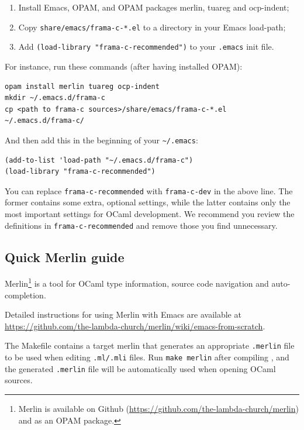 \begin{enumerate}
\item Install Emacs, OPAM, and OPAM packages \textsf{merlin}, \textsf{tuareg}
  and \textsf{ocp-indent};
\item Copy \texttt{share/emacs/frama-c-*.el} to a directory in your Emacs load-path;
\item Add \texttt{(load-library "frama-c-recommended")} to your \texttt{.emacs}
  init file.
\end{enumerate}

For instance, run these commands (after having installed OPAM):

\begin{verbatim}
opam install merlin tuareg ocp-indent
mkdir ~/.emacs.d/frama-c
cp <path to frama-c sources>/share/emacs/frama-c-*.el ~/.emacs.d/frama-c/
\end{verbatim}

And then add this in the beginning of your \texttt{\textasciitilde/.emacs}:

\begin{verbatim}
(add-to-list 'load-path "~/.emacs.d/frama-c")
(load-library "frama-c-recommended")
\end{verbatim}

You can replace \texttt{frama-c-recommended} with \texttt{frama-c-dev} in the
above line. The former contains some extra, optional settings, while the latter
contains only the most important settings for OCaml development. We recommend
you review the definitions in \texttt{frama-c-recommended} and remove those you
find unnecessary.

\subsection{Quick Merlin guide}

Merlin\footnote{Merlin is available on Github
  (\url{https://github.com/the-lambda-church/merlin}) and as an OPAM package.}
is a tool for OCaml type information, source code navigation and
auto-completion.

Detailed instructions for using Merlin with Emacs are available at
\url{https://github.com/the-lambda-church/merlin/wiki/emacs-from-scratch}.

The \framac Makefile contains a target \textsf{merlin} that generates an
appropriate \texttt{.merlin} file to be used when editing \framac
\texttt{.ml/.mli} files. Run \texttt{make merlin} after compiling \framac,
and the generated \texttt{.merlin} file will be automatically used when opening 
\framac OCaml sources.

